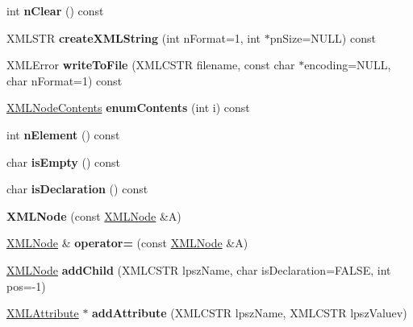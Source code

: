 \begin{DoxyCompactItemize}
int {\bfseries n\+Clear} () const
\item 
\hypertarget{struct_x_m_l_node_a9e19d3587f88f503ff1cfd98fcd13cb1}{}\label{struct_x_m_l_node_a9e19d3587f88f503ff1cfd98fcd13cb1} 
X\+M\+L\+S\+TR {\bfseries create\+X\+M\+L\+String} (int n\+Format=1, int $\ast$pn\+Size=N\+U\+LL) const
\item 
\hypertarget{struct_x_m_l_node_acef9de855bd31c6cda5482cb296f28ae}{}\label{struct_x_m_l_node_acef9de855bd31c6cda5482cb296f28ae} 
X\+M\+L\+Error {\bfseries write\+To\+File} (X\+M\+L\+C\+S\+TR filename, const char $\ast$encoding=N\+U\+LL, char n\+Format=1) const
\item 
\hypertarget{struct_x_m_l_node_a2406beecada2b815907eaac2c7db035b}{}\label{struct_x_m_l_node_a2406beecada2b815907eaac2c7db035b} 
\hyperlink{struct_x_m_l_node_contents}{X\+M\+L\+Node\+Contents} {\bfseries enum\+Contents} (int i) const
\item 
\hypertarget{struct_x_m_l_node_a1b13a6dc1cb8e7248caedd4960d7ba60}{}\label{struct_x_m_l_node_a1b13a6dc1cb8e7248caedd4960d7ba60} 
int {\bfseries n\+Element} () const
\item 
\hypertarget{struct_x_m_l_node_ab888c4755daee4a2f976713531f1e3c3}{}\label{struct_x_m_l_node_ab888c4755daee4a2f976713531f1e3c3} 
char {\bfseries is\+Empty} () const
\item 
\hypertarget{struct_x_m_l_node_affcffca699c492a1d26a037e958c14f5}{}\label{struct_x_m_l_node_affcffca699c492a1d26a037e958c14f5} 
char {\bfseries is\+Declaration} () const
\item 
\hypertarget{struct_x_m_l_node_a138099a1355b9d4103c239d9042adad3}{}\label{struct_x_m_l_node_a138099a1355b9d4103c239d9042adad3} 
{\bfseries X\+M\+L\+Node} (const \hyperlink{struct_x_m_l_node}{X\+M\+L\+Node} \&A)
\item 
\hypertarget{struct_x_m_l_node_ac7201d06ce47509423dd7cc937e69cf8}{}\label{struct_x_m_l_node_ac7201d06ce47509423dd7cc937e69cf8} 
\hyperlink{struct_x_m_l_node}{X\+M\+L\+Node} \& {\bfseries operator=} (const \hyperlink{struct_x_m_l_node}{X\+M\+L\+Node} \&A)
\item 
\hypertarget{struct_x_m_l_node_a71645ec6bcd94ff4bff62810377954ce}{}\label{struct_x_m_l_node_a71645ec6bcd94ff4bff62810377954ce} 
\hyperlink{struct_x_m_l_node}{X\+M\+L\+Node} {\bfseries add\+Child} (X\+M\+L\+C\+S\+TR lpsz\+Name, char is\+Declaration=F\+A\+L\+SE, int pos=-\/1)
\item 
\hypertarget{struct_x_m_l_node_a7938c43648ce7ed32efc9f0a5e3b5d2c}{}\label{struct_x_m_l_node_a7938c43648ce7ed32efc9f0a5e3b5d2c} 
\hyperlink{struct_x_m_l_attribute}{X\+M\+L\+Attribute} $\ast$ {\bfseries add\+Attribute} (X\+M\+L\+C\+S\+TR lpsz\+Name, X\+M\+L\+C\+S\+TR lpsz\+Valuev)

\end{DoxyCompactItemize}
